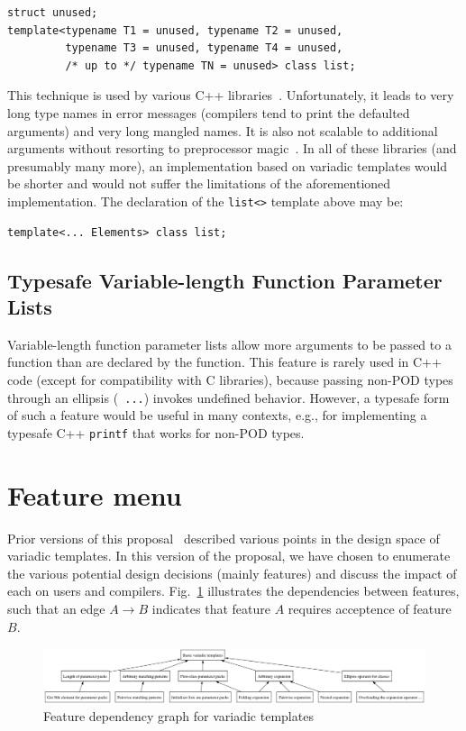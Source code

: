 \documentclass{article}
\begin{document}
\begin{verbatim}
struct unused;
template<typename T1 = unused, typename T2 = unused, 
         typename T3 = unused, typename T4 = unused, 
         /* up to */ typename TN = unused> class list;
\end{verbatim}

This technique is used by various C++ libraries~\cite{Tuples01,
Jarvi02, Gurtovoy02}. Unfortunately, it leads to very
long type names in error messages (compilers tend to print the
defaulted arguments) and very long mangled names. It is also not
scalable to additional arguments without resorting to preprocessor
magic~\cite{Preprocessor01}. In all of these libraries (and presumably
many more), an implementation based on variadic templates would be
shorter and would not suffer the limitations of the aforementioned
implementation. The declaration of the {\tt list<>} template above may
be:
\begin{verbatim}
template<... Elements> class list;
\end{verbatim}

\subsection{Typesafe Variable-length Function Parameter Lists}
Variable-length function parameter lists allow more arguments to be
passed to a function than are declared by the function. This feature
is rarely used in C++ code (except for compatibility with C
libraries), because passing non-POD types through an ellipsis ({\tt
  ...}) invokes undefined behavior. However, a typesafe form of such a
feature would be useful in many contexts, e.g., for implementing a
typesafe C++ {\tt printf} that works for non-POD types.

\section{Feature menu}
Prior versions of this proposal~\cite{GPJ03,GJP04a} described various
points in the design space of variadic templates. In this version of
the proposal, we have chosen to enumerate the various potential design
decisions (mainly features) and discuss the impact of each on users
and compilers. Fig.~\ref{fig:dependencies} illustrates the
dependencies between features, such that an edge $A \rightarrow B$
indicates that feature $A$ requires acceptence of feature $B$.

\begin{figure}
\center
\includegraphics[scale=0.35]{vt_deps.png}
\caption{Feature dependency graph for variadic templates}
\label{fig:dependencies}
\end{figure}
\end{document}
